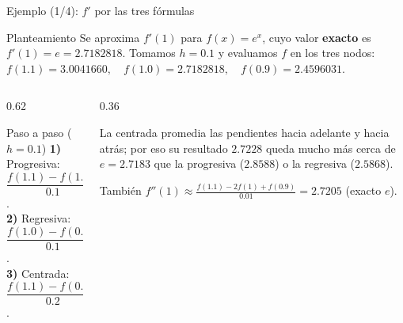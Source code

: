 \documentclass[aspectratio=169,10pt]{beamer}
\begin{document}
\begin{frame}{Ejemplo (1/4): $f'$ por las tres fórmulas}
\begin{cardidea}{Planteamiento}{\faLightbulb}
{\footnotesize Se aproxima $f'(1)$ para $f(x)=e^x$, cuyo valor \textbf{exacto} es $f'(1)=e=2.7182818$. Tomamos $h=0.1$ y evaluamos $f$ en los tres nodos:\\[0.6mm]
\centering
$f(1.1)=3.0041660,\quad f(1.0)=2.7182818,\quad f(0.9)=2.4596031.$}
\end{cardidea}
\vspace{1.5mm}
\begin{columns}[T]
\begin{column}{0.62\textwidth}
\begin{cardgear}{Paso a paso ($h=0.1$)}{\faCalculator}
{\footnotesize
\textbf{1)} Progresiva:\\[0.2mm]
$\dfrac{f(1.1)-f(1.0)}{0.1}=\dfrac{0.2858842}{0.1}=2.8588420$.\\[1.2mm]
\textbf{2)} Regresiva:\\[0.2mm]
$\dfrac{f(1.0)-f(0.9)}{0.1}=\dfrac{0.2586787}{0.1}=2.5867872$.\\[1.2mm]
\textbf{3)} Centrada:\\[0.2mm]
$\dfrac{f(1.1)-f(0.9)}{0.2}=\dfrac{0.5445629}{0.2}=2.7228146$.}
\end{cardgear}
\end{column}
\begin{column}{0.36\textwidth}
\begin{cardnota}[\faInfoCircle]
{\footnotesize La centrada promedia las pendientes hacia adelante y hacia atrás; por eso su resultado $2.7228$ queda mucho más cerca de $e=2.7183$ que la progresiva ($2.8588$) o la regresiva ($2.5868$).}
\end{cardnota}
\vspace{1mm}
\begin{cardnota}[\faSuperscript]
{\footnotesize También $f''(1)\approx\frac{f(1.1)-2f(1)+f(0.9)}{0.01}=2.7205$ (exacto $e$).}
\end{cardnota}
\end{column}
\end{columns}
\end{frame}
\end{document}
